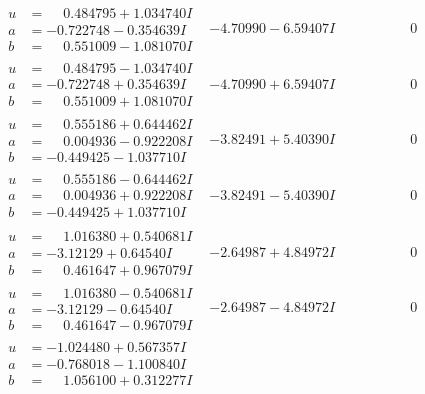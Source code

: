\documentclass[1p]{elsarticle_modified}
\theoremstyle{definition}
\begin{document}
$$\begin{array}{c|c|c}
\begin{aligned}
u &= \phantom{-}0.484795 + 1.034740 I \\
a &= -0.722748 - 0.354639 I \\
b &= \phantom{-}0.551009 - 1.081070 I\end{aligned}
 & -4.70990 - 6.59407 I & \phantom{-0.000000 } 0 \\ \hline\begin{aligned}
u &= \phantom{-}0.484795 - 1.034740 I \\
a &= -0.722748 + 0.354639 I \\
b &= \phantom{-}0.551009 + 1.081070 I\end{aligned}
 & -4.70990 + 6.59407 I & \phantom{-0.000000 } 0 \\ \hline\begin{aligned}
u &= \phantom{-}0.555186 + 0.644462 I \\
a &= \phantom{-}0.004936 - 0.922208 I \\
b &= -0.449425 - 1.037710 I\end{aligned}
 & -3.82491 + 5.40390 I & \phantom{-0.000000 } 0 \\ \hline\begin{aligned}
u &= \phantom{-}0.555186 - 0.644462 I \\
a &= \phantom{-}0.004936 + 0.922208 I \\
b &= -0.449425 + 1.037710 I\end{aligned}
 & -3.82491 - 5.40390 I & \phantom{-0.000000 } 0 \\ \hline\begin{aligned}
u &= \phantom{-}1.016380 + 0.540681 I \\
a &= -3.12129 + 0.64540 I \\
b &= \phantom{-}0.461647 + 0.967079 I\end{aligned}
 & -2.64987 + 4.84972 I & \phantom{-0.000000 } 0 \\ \hline\begin{aligned}
u &= \phantom{-}1.016380 - 0.540681 I \\
a &= -3.12129 - 0.64540 I \\
b &= \phantom{-}0.461647 - 0.967079 I\end{aligned}
 & -2.64987 - 4.84972 I & \phantom{-0.000000 } 0 \\ \hline\begin{aligned}
u &= -1.024480 + 0.567357 I \\
a &= -0.768018 - 1.100840 I \\
b &= \phantom{-}1.056100 + 0.312277 I\end{aligned}

\end{array}$$
\end{document}
